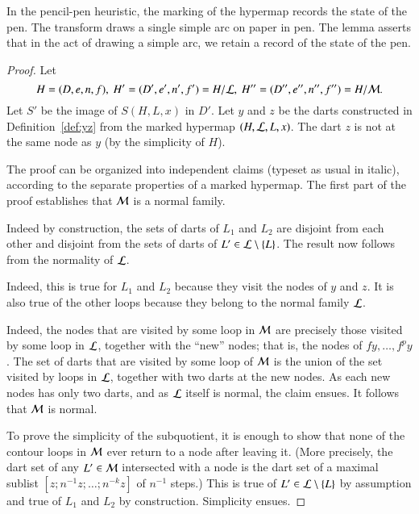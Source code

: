 In the pencil-pen heuristic, the marking of the hypermap records the
state of the pen.  The transform draws a single simple arc on paper in
pen.  The lemma asserts that in the act of drawing a simple arc, we
retain a record of the state of the pen.

\begin{proof} Let 
\[ 
H=(D,e,n,f),\   H' =(D',e',n',f') = H/{\cal
    L},\  H'' = (D'',e'',n'',f'') = H/{\cal M}.   
\] 
Let $S'$ be the image of $S(H,L,x)$ in $D'$.  Let $y$ and $z$ be the darts
constructed in Definition~\ref{def:yz} from the marked hypermap $(H,{\cal
  L},L,x)$.  The dart $z$ is not at the same node as $y$ (by
the simplicity of $H$).

The proof can be organized into independent claims (typeset as usual in italic), according to the
separate properties of a marked hypermap.  The first part of the proof
establishes that ${\cal M}$ is a normal family.


 
Indeed by construction, the sets of darts of $L_1$ and $L_2$ are
disjoint from each other and disjoint from the sets of darts of $L'\in
{\cal L}\setminus \{L\}$.  The result now follows from the normality
of ${\cal L}$.

   Indeed, this
is true for $L_1$ and $L_2$ because they visit the nodes of $y$ and
$z$.  It is also true of the other loops because they belong to the
normal family ${\cal L}$. 

  
Indeed, the nodes that are visited by some loop in ${\cal M}$ are
precisely those visited by some loop in ${\cal L}$, together with the
``new'' nodes; that is, the nodes of $f y,\ldots,f^p y$.  The set of
darts that are visited by some loop of ${\cal M}$ is the union of the
set visited by loops in ${\cal L}$, together with two darts at the
new nodes.  As each new nodes has only two darts, and as ${\cal L}$ itself
is normal, the claim ensues. It follows that ${\cal M}$ is normal.  


 To prove the simplicity of the subquotient, it is enough
to show that none of the contour loops in ${\cal M}$ ever return to a
node after leaving it.  (More precisely, the dart set of any
$L'\in{\cal M}$ intersected with a node is the dart set of a maximal
sublist $[z;n^{-1}z;\ldots;n^{-k}z]$ of $n^{-1}$ steps.)  This is true
of $L'\in{\cal L}\setminus\{L\}$ by assumption and true of $L_1$ and
$L_2$ by construction.  Simplicity ensues.


\end{proof}
